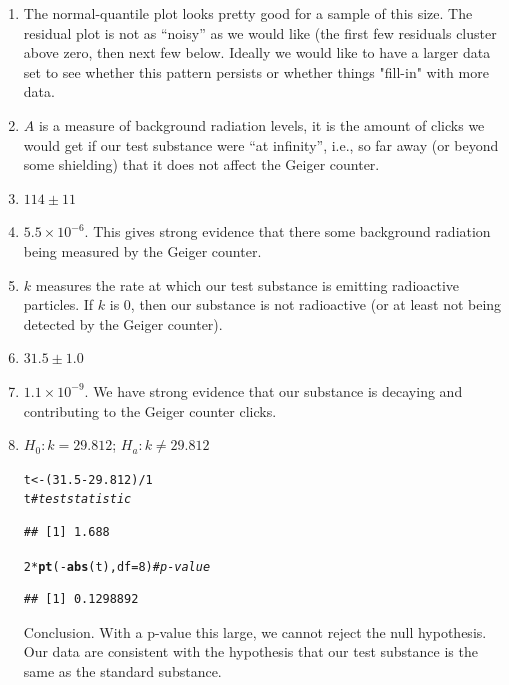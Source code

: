 \documentclass[twoside]{book}\usepackage[]{graphicx}\usepackage[]{xcolor}
\makeatletter
\newcommand{\hlnum}[1]{\textcolor[rgb]{0.686,0.059,0.569}{#1}}%
\newcommand{\hlcom}[1]{\textcolor[rgb]{0.678,0.584,0.686}{\textit{#1}}}%
\newcommand{\hlopt}[1]{\textcolor[rgb]{0,0,0}{#1}}%
\newcommand{\hlstd}[1]{\textcolor[rgb]{0.345,0.345,0.345}{#1}}%
\newcommand{\hlkwb}[1]{\textcolor[rgb]{0.69,0.353,0.396}{#1}}%
\newcommand{\hlkwc}[1]{\textcolor[rgb]{0.333,0.667,0.333}{#1}}%
\newcommand{\hlkwd}[1]{\textcolor[rgb]{0.737,0.353,0.396}{\textbf{#1}}}%
\newenvironment{kframe}{%
 \def\at@end@of@kframe{}%
 \ifinner\ifhmode%
  \def\at@end@of@kframe{\end{minipage}}%
  \begin{minipage}{\columnwidth}%
 \fi\fi%
 \def\FrameCommand##1{\hskip\@totalleftmargin \hskip-\fboxsep
 \colorbox{shadecolor}{##1}\hskip-\fboxsep
     \hskip-\linewidth \hskip-\@totalleftmargin \hskip\columnwidth}%
 \MakeFramed {\advance\hsize-\width
   \@totalleftmargin\z@ \linewidth\hsize
   \@setminipage}}%
 {\par\unskip\endMakeFramed%
 \at@end@of@kframe}
\newenvironment{knitrout}{}{} %
\makeatother
\begin{document}
\begin{solution}
	\begin{enumerate}
			\item
				The normal-quantile plot looks pretty good for a sample of this size.
				The residual plot is not as ``noisy'' as we would like (the first few residuals
				cluster above zero, then next few below.  Ideally we would like to have a larger 
				data set to see whether this pattern persists or whether things "fill-in" with more
				data.
			\item
				$A$ is a measure of background radiation levels, it is the amount of clicks 
				we would get if our test substance were ``at infinity'', i.e., so far away (or 
				beyond some shielding) that it does not affect the Geiger counter.
			\item
				$114 \pm 11$
			\item
				\ensuremath{5.5\times 10^{-6}}.  This gives strong evidence that there some background radiation
				being measured by the Geiger counter.
			\item
				$k$ measures the rate at which our test substance is emitting radioactive 
				particles.  If $k$ is 0, then our substance is not radioactive (or at least not
				being detected by the Geiger counter).
			\item
				$31.5  \pm 1.0$
			\item
				\ensuremath{1.1\times 10^{-9}}.  We have strong evidence that our substance is decaying and 
				contributing to the Geiger counter clicks.
			\item
				$H_0: k = 29.812$;  $H_a: k \neq 29.812$
\begin{knitrout}
\color{fgcolor}\begin{kframe}
\begin{alltt}
\hlstd{t} \hlkwb{<-} \hlstd{(}\hlnum{31.5} \hlopt{-} \hlnum{29.812}\hlstd{)}\hlopt{/}\hlnum{1}
\hlstd{t}  \hlcom{# test statistic}
\end{alltt}
\begin{verbatim}
## [1] 1.688
\end{verbatim}
\begin{alltt}
\hlnum{2} \hlopt{*} \hlkwd{pt}\hlstd{(}\hlopt{-}\hlkwd{abs}\hlstd{(t),} \hlkwc{df} \hlstd{=} \hlnum{8}\hlstd{)}  \hlcom{# p -value}
\end{alltt}
\begin{verbatim}
## [1] 0.1298892
\end{verbatim}
\end{kframe}
\end{knitrout}
				Conclusion.  With a p-value this large, we cannot reject the null hypothesis.
				Our data are consistent with the hypothesis that our test substance is the same
				as the standard substance.
	\end{enumerate}
\end{solution}
\end{document}
